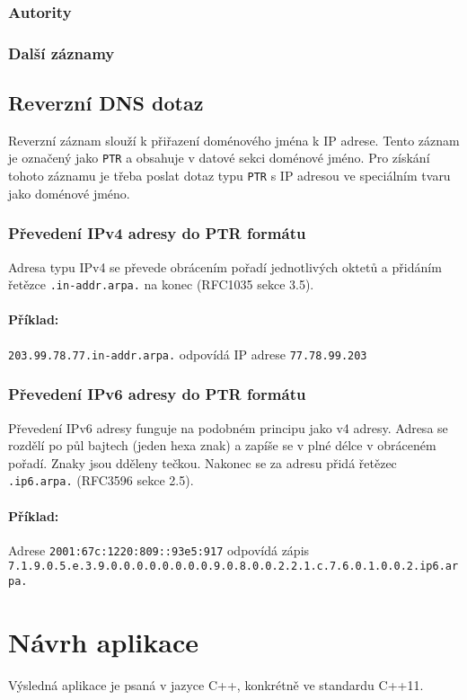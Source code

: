 \documentclass[a4paper,12pt]{article}
\begin{document}
\subsubsection{Autority}

\subsubsection{Další záznamy}


\subsection{Reverzní DNS dotaz}
Reverzní záznam slouží k přiřazení doménového jména k IP adrese. Tento záznam je označený jako \texttt{PTR} a obsahuje v datové sekci doménové jméno.
Pro získání tohoto záznamu je třeba poslat dotaz typu \texttt{PTR} s IP adresou ve speciálním tvaru jako doménové jméno.

\subsubsection{Převedení IPv4 adresy do PTR formátu}
Adresa typu IPv4 se převede obrácením pořadí jednotlivých oktetů a přidáním řetězce \texttt{.in-addr.arpa.} na konec (RFC1035 sekce 3.5).
\paragraph{Příklad:}\texttt{203.99.78.77.in-addr.arpa.} odpovídá IP adrese \texttt{77.78.99.203}

\subsubsection{Převedení IPv6 adresy do PTR formátu}
Převedení IPv6 adresy funguje na podobném principu jako v4 adresy. Adresa se rozdělí po půl bajtech (jeden hexa znak) a zapíše se v plné délce v obráceném pořadí. Znaky jsou dděleny tečkou. Nakonec se za adresu přidá řetězec \texttt{.ip6.arpa.} (RFC3596 sekce 2.5).
\paragraph{Příklad:}Adrese \texttt{2001:67c:1220:809::93e5:917} odpovídá zápis \texttt{7.1.9.0.5.e.3\linebreak .9.0.0.0.0.0.0.0.0.9.0.8.0.0.2.2.1.c.7.6.0.1.0.0.2.ip6.arpa.}

\section{Návrh aplikace}
Výsledná aplikace je psaná v jazyce C++, konkrétně ve standardu C++11. 
\end{document}
